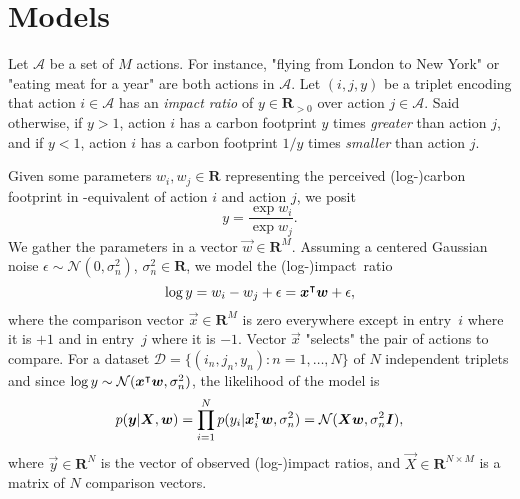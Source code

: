 \section{Models}%
\label{clm:sec:models}

Let $ \mathcal{A} $ be a set of $M$ actions.
For instance, "flying from London to New York" or "eating meat for a year" are both actions in $ \mathcal{A}$.
Let $ (i, j, y) $ be a triplet encoding that action $i \in \mathcal{A}$ has an \textit{impact ratio} of $y \in \mathbf{R}_{>0}$ over action $j \in \mathcal{A}$.
Said otherwise, if $y > 1$, action $i$ has a carbon footprint $y$ times \textit{greater} than action $j$, and if $y < 1$, action $i$ has a carbon footprint $1/y$ times \textit{smaller} than action $j$.

Given some parameters $w_i, w_j \in \mathbf{R}$ representing the perceived (log-)carbon footprint in \COtwo-equivalent of action $i$ and action $j$, we posit
\begin{equation*}
	y = \frac{\exp w_i}{\exp w_j}.
\end{equation*}
We gather the parameters in a vector $\vec{w} \in \mathbf{R}^M$.
Assuming a centered Gaussian noise $\epsilon \sim \mathcal{N}(0, \sigma^2_n)$, $\sigma_n^2 \in \mathbf{R}$, we model the (log-)impact~ratio
\begin{equation}
	\log y = w_i - w_j + \epsilon = \bm{x}^\intercal\bm{w} + \epsilon,
\end{equation}
where the comparison vector $\vec{x} \in \mathbf{R}^M$ is zero everywhere except in entry~$i$ where it is $+1$ and in entry~$j$ where it is $-1$.
Vector $\vec{x}$ "selects" the pair of actions to compare.
For a dataset $ \mathcal{D} = \{ (i_n, j_n, y_n) : n = 1, \ldots, N \}$ of $N$ independent triplets and since \mbox{$\log y \sim \mathcal{N}(\bm{x}^\intercal \bm{w}, \sigma^2_n)$}, the likelihood of the model is
\begin{equation*}
	p(\bm{y} \mbox{$|$} \bm{X}, \bm{w}) = \prod_{i=1}^N p(y_i \mbox{$|$} \bm{x}_i^\intercal \bm{w}, \sigma_n^2) = \mathcal{N}(\bm{X} \bm{w}, \sigma_n^2\bm{I}),
\end{equation*}
where $\vec{y} \in \mathbf{R}^N$ is the vector of observed (log-)impact ratios, and $\vec{X} \in \mathbf{R}^{N \times M}$ is a matrix of $N$ comparison vectors.

